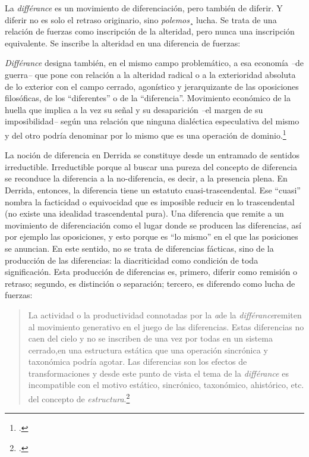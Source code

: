 \documentclass{book}
\begin{document}
La \emph{différance} es un movimiento de diferenciación, pero también de
diferir. Y diferir no es solo el retraso originario, sino
\emph{polemos}¸ lucha. Se trata de una relación de fuerzas como
inscripción de la alteridad, pero nunca una inscripción equivalente. Se
inscribe la alteridad en una diferencia de fuerzas:

\emph{Différance} designa también, en el mismo campo problemático, a esa
economía \emph{--}de guerra\emph{--} que pone con relación a la
alteridad radical o a la exterioridad absoluta de lo exterior con el
campo cerrado, agonístico y jerarquizante de las oposiciones
filosóficas, de los ``diferentes'' o de la ``diferencia''. Movimiento
económico de la huella que implica a la vez su señal y su desaparición
\emph{--}el margen de su imposibilidad\emph{--} según una relación que
ninguna dialéctica especulativa del mismo y del otro podría denominar
por lo mismo que es una operación de dominio.\footcite[9]{derrida1997}

La noción de diferencia en Derrida se constituye desde un entramado de
sentidos irreductible. Irreductible porque al buscar una pureza del
concepto de diferencia se reconduce la diferencia a la no-diferencia, es
decir, a la presencia plena. En Derrida, entonces, la diferencia tiene
un estatuto cuasi-trascendental. Ese \enquote{cuasi} nombra la facticidad o
equivocidad que es imposible reducir en lo trascendental (no existe una
idealidad trascendental pura). Una diferencia que remite a un movimiento
de diferenciación como el lugar donde se producen las diferencias, así
por ejemplo las oposiciones, y esto porque es \enquote{lo mismo} en el que las
posiciones se anuncian. En este sentido, no se trata de diferencias
fácticas, sino de la producción de las diferencias: la diacriticidad
como condición de toda significación. Esta producción de diferencias es,
primero, diferir como remisión o retraso; segundo, es distinción o
separación; tercero, es diferendo como lucha de fuerzas:

\begin{quote}
La actividad o la productividad connotadas por la \emph{a}de la
\emph{différance}remiten al movimiento generativo en el juego de las
diferencias. Estas diferencias no caen del cielo y no se inscriben de
una vez por todas en un sistema cerrado,en una estructura estática que
una operación sincrónica y taxonómica podría agotar. Las diferencias son
los efectos de transformaciones y desde este punto de vista el tema de
la \emph{différance} es incompatible con el motivo estático, sincrónico,
taxonómico, ahistórico, etc. del concepto de
\emph{estructura}.\footcite[37]{derrida1997}
\end{quote}
\end{document}

